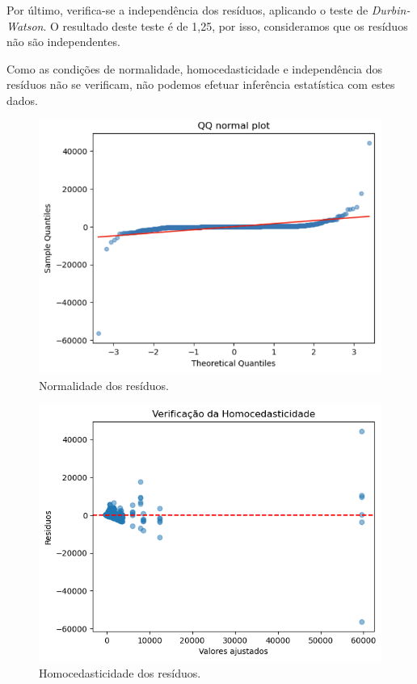 \documentclass[conference]{IEEEtran}
\begin{document}
Por último, verifica-se a independência dos resíduos, aplicando o teste de \textit{Durbin-Watson}. O resultado deste teste é de 1,25, por isso, consideramos que os resíduos não são independentes.

Como as condições de normalidade, homocedasticidade e independência dos resíduos não se verificam, não podemos efetuar inferência estatística com estes dados.


\begin{figure}
	\centering
	\includegraphics[width=0.9\linewidth]{4_3_2b}
	\caption{Normalidade dos resíduos.}
	\label{fig:qqplot}
\end{figure}

\begin{figure}
	\centering
	\includegraphics[width=0.9\linewidth]{4_3_2_homocedasticidade}
	\caption{Homocedasticidade dos resíduos.}
	\label{fig:4_3_2_homocedasticidade}
\end{figure}
\medskip
\end{document}
